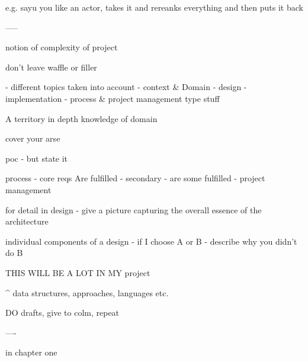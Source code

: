 e.g. sayu you like an actor, takes it and rereanks everything and then puts it back












-----

notion of complexity of project


don't leave waffle or filler 

- different topics taken into account
- context & Domain
- design
- implementation
- process & project management type stuff

A territory 
in depth knowledge of domain


cover your arse

poc - but state it

process
- core reqs Are fulfilled
- secondary - are some fulfilled
- project management 

for detail
in design - give a picture capturing the overall essence of the architecture

individual components of a design
- if I choose A or B - describe why you didn't do B

THIS WILL BE A LOT IN MY project

^ data structures, approaches, languages etc.


DO drafts, give to colm, repeat


----

in chapter one



